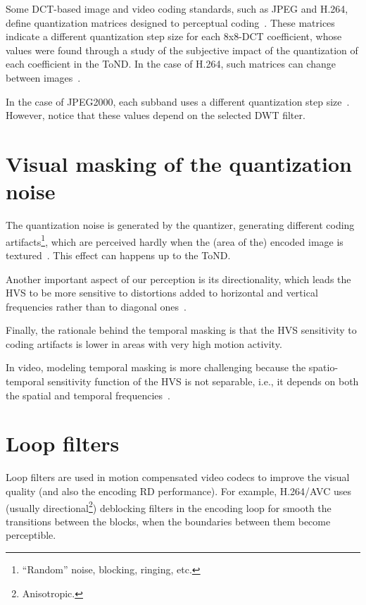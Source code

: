 Some DCT-based image and video coding standards, such as JPEG and
H.264, define quantization matrices designed to perceptual
coding~\cite{ernawan2014optimal}. These matrices indicate a different
quantization step size for each 8x8-DCT coefficient, whose values were
found through a study of the subjective impact of the quantization of
each coefficient in the ToND. In the case of H.264, such matrices can
change between images~\cite{naccari2014perceptually}.

In the case of JPEG2000, each subband uses a different quantization
step size~\cite{liu2020visibility}. However, notice that these values
depend on the selected DWT filter.

\section{Visual masking of the quantization noise}

The quantization noise is generated by the quantizer, generating
different coding artifacts\footnote{``Random'' noise, blocking,
  ringing, etc.}, which are perceived hardly when the (area of the)
encoded image is textured~\cite{wu2017digital}. This effect can
happens up to the ToND.

Another important aspect of our perception is its directionality,
which leads the HVS to be more sensitive to distortions added to
horizontal and vertical frequencies rather than to diagonal
ones~\cite{naccari2014perceptually}.

Finally, the rationale behind the temporal masking is that the HVS
sensitivity to coding artifacts is lower in areas with very high
motion activity.

In video, modeling temporal masking is more challenging because
the spatio-temporal sensitivity function of the HVS is not separable,
i.e., it depends on both the spatial and temporal
frequencies~\cite{naccari2014perceptually}.

\section{Loop filters}

Loop filters are used in motion compensated video codecs to improve
the visual quality (and also the encoding RD performance). For
example, H.264/AVC uses (usually directional\footnote{Anisotropic.})
deblocking filters in the encoding loop for smooth the transitions
between the blocks, when the boundaries between them become
perceptible.


